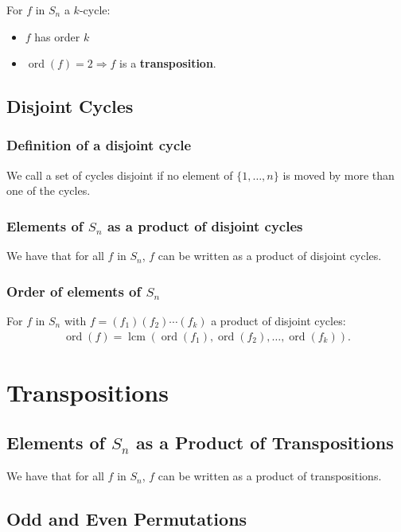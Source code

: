 \documentclass[a4paper, 12pt, twoside]{article}
\DeclareMathOperator{\Ord}{ord}
\DeclareMathOperator{\Lcm}{lcm}
\begin{document}
For $f$ in $S_n$ a $k$-cycle:

\begin{itemize}
      \item $f$ has order $k$
      \item $\Ord(f) = 2 \Rightarrow f$ is a \textbf{transposition}.
\end{itemize}

\subsection{Disjoint Cycles}

\subsubsection{Definition of a disjoint cycle}

We call a set of cycles disjoint if no element of $\{1, \ldots, n\}$ is
moved by more than one of the cycles.

\subsubsection{Elements of $S_n$ as a product of disjoint cycles}

We have that for all $f$ in $S_n$, $f$ can be written as a product
of disjoint cycles.

\subsubsection{Order of elements of $S_n$}

For $f$ in $S_n$ with $f = (f_1)(f_2)\cdots(f_k)$ a product of
disjoint cycles:
\begin{align*}
      \Ord(f) = \Lcm(\Ord(f_1), \Ord(f_2), \ldots, \Ord(f_k)).
\end{align*}

\section{Transpositions}

\subsection{Elements of $S_n$ as a Product of Transpositions}

We have that for all $f$ in $S_n$, $f$ can be written as a product
of transpositions.

\subsection{Odd and Even Permutations}
\end{document}
